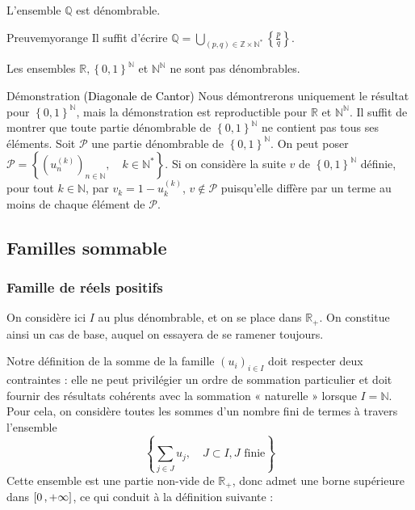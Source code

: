     \begin{coro}{}{}
        L’ensemble $\mathbb{Q}$ est dénombrable.
    \end{coro}

    \begin{demo}{Preuve}{myorange}
        Il suffit d’écrire $\mathbb{Q} = \bigcup_{(p,q) \in \mathbb{Z} \times \mathbb{N}^*} \left\{\frac{p}{q}\right\}$.
    \end{demo}

    \begin{prop}{}{}
        Les ensembles $\mathbb{R}, \left\{0,1\right\}^{\mathbb{N}}$ et $\mathbb{N}^{\mathbb{N}}$ ne sont pas dénombrables.
    \end{prop}

    \begin{demo}{Démonstration \textcolor{black}{(Diagonale de Cantor)}}{}
        Nous démontrerons uniquement le résultat pour $\left\{0,1\right\}^{\mathbb{N}}$, mais la démonstration est reproductible pour $\mathbb{R}$ et $\mathbb{N}^{\mathbb{N}}$. Il suffit de montrer que toute partie dénombrable de $\left\{0,1\right\}^{\mathbb{N}}$ ne contient pas tous ses éléments. Soit $\mathcal{P}$ une partie dénombrable de $\left\{0,1\right\}^{\mathbb{N}}$. On peut poser $\mathcal{P} = \left\{(u_n^{(k)})_{n \in \mathbb{N}}, \quad k \in \mathbb{N}^*\right\}$. Si on considère la suite $v$ de $\left\{0,1\right\}^{\mathbb{N}}$ définie, pour tout $k \in \mathbb{N}$, par $v_k = 1 - u_k^{(k)}$, $v \notin \mathcal{P}$ puisqu’elle diffère par un terme au moins de chaque élément de $\mathcal{P}$.
    \end{demo}

\subsection{Familles sommable}

    \subsubsection{Famille de réels positifs}

    On considère ici $I$ au plus dénombrable, et on se place dans $\mathbb{R}_+$. On constitue ainsi un cas de base, auquel on essayera de se ramener toujours. 

    Notre définition de la somme de la famille $(u_i)_{i \in I}$ doit respecter deux contraintes : elle ne peut privilégier un ordre de sommation particulier et doit fournir des résultats cohérents avec la sommation « naturelle » lorsque $I = \mathbb{N}$. Pour cela, on considère toutes les sommes d’un nombre fini de termes à travers l’ensemble 
    \[ \left\{\sum_{j \in J} u_j, \quad J \subset I, J \text{ finie}\right\} \]
    Cette ensemble est une partie non-vide de $\mathbb{R}_+$, donc admet une borne supérieure dans $\left[ 0 \, , +\infty \right]$, ce qui conduit à la définition suivante :

